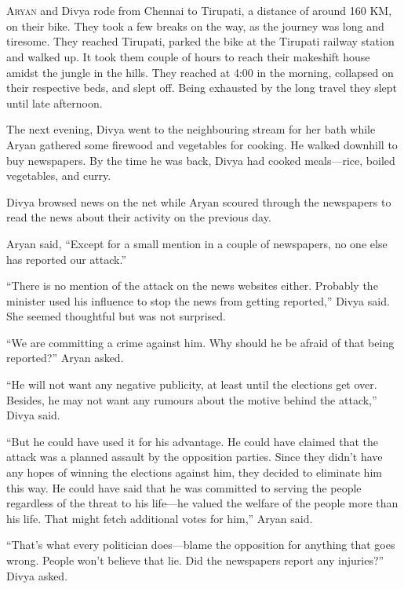 \chapter{}
\lettrine{A}{ryan} and Divya rode from Chennai to Tirupati, a distance of around
160 KM, on their bike.  They took a few breaks on the way, as the journey was
long and tiresome. They reached Tirupati, parked the bike at the Tirupati
railway station and walked up.  It took them couple of hours to reach their
makeshift house amidst the jungle in the hills. They reached at 4:00 in the
morning, collapsed on their respective beds, and slept off. Being exhausted by
the long travel they slept until late afternoon.

The next evening, Divya went to the neighbouring stream for her bath while Aryan
gathered some firewood and vegetables for cooking. He walked downhill to buy
newspapers. By the time he was back, Divya had cooked meals—rice, boiled
vegetables, and curry.

Divya browsed news on the net while Aryan scoured through the newspapers to read
the news about their activity on the previous day.

Aryan said, “Except for a small mention in a couple of newspapers, no one else
has reported our attack.”

“There is no mention of the attack on the news websites either. Probably the
minister used his influence to stop the news from getting reported,” Divya said.
She seemed thoughtful but was not surprised.

“We are committing a crime against him. Why should he be afraid of that being
reported?” Aryan asked.

“He will not want any negative publicity, at least until the elections get over.
Besides, he may not want any rumours about the motive behind the attack,” Divya
said.

“But he could have used it for his advantage. He could have claimed that the
attack was a planned assault by the opposition parties. Since they didn't have
any hopes of winning the elections against him, they decided to eliminate him
this way. He could have said that he was committed to serving the people
regardless of the threat to his life—he valued the welfare of the people more
than his life. That might fetch additional votes for him,” Aryan said.

“That's what every politician does—blame the opposition for anything that goes
wrong. People won't believe that lie. Did the newspapers report any injuries?”
Divya asked.

